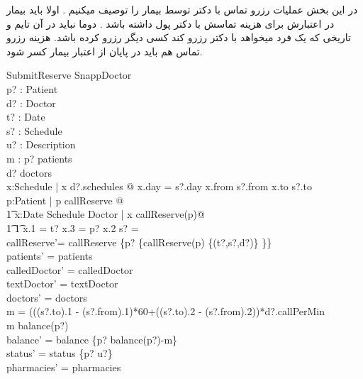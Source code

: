 \documentclass{article}
\begin{document}
در این بخش عملیات رزرو تماس با دکتر توسط بیمار را توصیف میکنیم . اولا باید بیمار در اعتبارش برای هزینه تماسش با دکتر پول داشته باشد . دوما نباید در آن تایم و تاریخی که یک فرد میخواهد با دکتر رزرو کند کسی دیگر رزرو کرده باشد. هزینه رزرو تماس هم باید در پایان از اعتبار بیمار کسر شود.
\begin{schema}{SubmitReserve}
\Delta SnappDoctor\\
p? : Patient\\
d? : Doctor\\
t? : Date\\
s? : Schedule\\
u? : Description\\
m : \nat
\where
p? \in patients\\
d? \in doctors\\
\exists x:Schedule | x \in d?.schedules @ x.day = s?.day \land x.from \le s?.from \land x.to \ge s?.to\\
\forall p:Patient | p \in callReserve @ \\
\t1 \forall x:Date \cross Schedule \cross Doctor | x \in callReserve(p)@\\
\t1 \t1 x.1 = t? \land x.3 = p? \implies x.2 \cap s? = \emptyset\\
callReserve'= callReserve \oplus \{p? \mapsto \{callReserve(p) \cup \{(t?,s?,d?)\} \}\}\\

patients' = patients\\ 
calledDoctor' = calledDoctor\\
textDoctor' = textDoctor\\
doctors' = doctors\\
m = (((s?.to).1 - (s?.from).1)*60+((s?.to).2 - (s?.from).2))*d?.callPerMin \\
m \le balance(p?)\\
balance' = balance \oplus \{p? \mapsto balance(p?)-m\} \\
status' = status \oplus \{p? \mapsto u?\}\\
pharmacies' = pharmacies
\end{schema}
\end{document}
